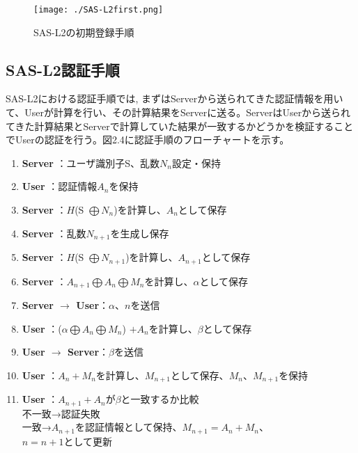 \documentclass{thesis}
\begin{document}
\begin{figure}[H]
 \center
 \texttt{[image: ./SAS-L2first.png]}
 \caption{SAS-L2の初期登録手順}
\end{figure}

\subsection{SAS-L2認証手順}
SAS-L2における認証手順では, まずはServerから送られてきた認証情報を用いて、Userが計算を行い、その計算結果をServerに送る。ServerはUserから送られてきた計算結果とServerで計算していた結果が一致するかどうかを検証することでUserの認証を行う。図2.4に認証手順のフローチャートを示す。

\begin{enumerate}
\item \textbf{Server} \hspace{41pt}：ユーザ識別子S、乱数$N_n$設定・保持
\item \textbf{User} \hspace{50pt}：認証情報$A_n$を保持
\item \textbf{Server} \hspace{41pt}：$H$(S $\bigoplus N_n$)を計算し、$A_n$として保存
\item \textbf{Server} \hspace{41pt}：乱数$N_{n+1}$を生成し保存
\item \textbf{Server} \hspace{41pt}：$H$(S $\bigoplus N_{n+1}$)を計算し、$A_{n+1}$として保存
\item \textbf{Server} \hspace{41pt}：$A_{n+1} \bigoplus A_n \bigoplus M_n$を計算し、$\alpha$として保存
\item \textbf{Server $\rightarrow$ User}：$\alpha、n$を送信
\item \textbf{User} \hspace{50pt}：($\alpha \bigoplus A_n \bigoplus M_n$) $+ A_n$を計算し、$\beta$として保存
\item \textbf{User $\rightarrow$ Server}：$\beta$を送信
\item \textbf{User} \hspace{51pt}：$A_n + M_n$を計算し、$M_{n+1}$として保存、$M_n、M_{n+1}$を保持
\item \textbf{User} \hspace{51pt}：$A_{n+1} + A_n$が$\beta$と一致するか比較 \\
\hspace{91pt}不一致→認証失敗 \\
\hspace{91pt}一致→$A_{n+1}$を認証情報として保持、$M_{n+1} = A_n + M_n$、\\
\hspace{128pt}$n = n+1$として更新
\end{enumerate}
\end{document}
